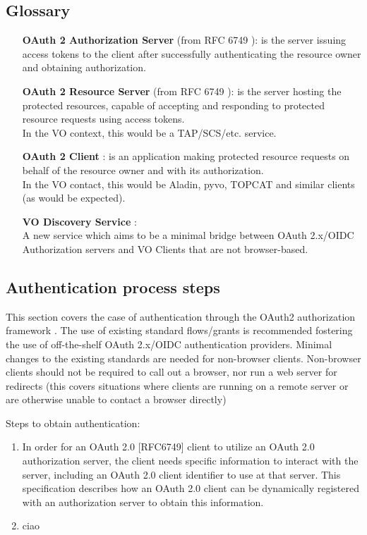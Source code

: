\documentclass[11pt,a4paper]{ivoa}
\begin{document}
\subsection{Glossary}
\begin{itemize}
\item[{\bf OAuth 2 Authorization Server}](from RFC 6749 \citep{rfc6749}): 
    is the server 
    issuing access tokens to the client after successfully authenticating 
    the resource owner and obtaining authorization.
\item[{\bf OAuth 2 Resource Server}](from RFC 6749 \citep{rfc6749}):
    is the server hosting the
    protected resources, capable of accepting and responding to
    protected resource requests using access tokens.\\
    In the VO context, this would be a TAP/SCS/etc. service.
\item[{\bf OAuth 2 Client}]: is an application making protected
    resource requests on behalf of the resource owner and with its
    authorization.\\
    In the VO contact, this would be Aladin, pyvo, TOPCAT and
    similar clients (as would be expected).
\item[{\bf VO Discovery Service}]: \\
    A new service which aims to be a minimal
    bridge between OAuth 2.x/OIDC Authorization servers and VO Clients
    that are not browser-based.
\end{itemize}

\subsection{Authentication process steps}
This section covers the case of authentication through the
OAuth2 authorization framework \citep{rfc6749}. 
The use of existing standard flows/grants 
is recommended fostering the use of off-the-shelf 
OAuth 2.x/OIDC authentication providers.
Minimal changes to the existing standards are needed for
non-browser clients. Non-browser clients should not be required
to call out a browser, nor run a web server for redirects (this
covers situations where clients are running on a remote server 
or are otherwise unable to contact a browser directly)

Steps to obtain authentication:
\begin{enumerate}
    \item In order for an OAuth 2.0 [RFC6749] client to utilize an OAuth 2.0
   authorization server, the client needs specific information to
   interact with the server, including an OAuth 2.0 client identifier to
   use at that server.  This specification describes how an OAuth 2.0
   client can be dynamically registered with an authorization server to
   obtain this information.
   \item ciao
\end{enumerate}
\end{document}
